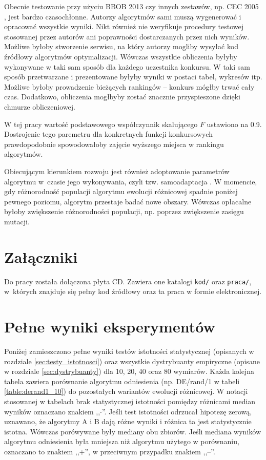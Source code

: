 \documentclass[a4paper,onecolumn,oneside,12pt,wide,floatssmall]{mwrep}
\theoremstyle{definition}
\theoremstyle{plain}%
\theoremstyle{remark}
\begin{document}
Obecnie testowanie przy użyciu BBOB 2013 czy innych zestawów, np. CEC 2005 \cite{cec},
jest bardzo czasochłonne. Autorzy algorytmów sami muszą wygenerować i opracować wszystkie 
wyniki.
Nikt również nie weryfikuje procedury testowej stosowanej przez autorów ani poprawności
dostarczanych przez nich wyników. Możliwe byłoby stworzenie serwisu, na który autorzy mogliby
wysyłać kod źródłowy algorytmów optymalizacji. Wówczas wszystkie obliczenia byłyby wykonywane w taki
sam sposób dla każdego uczestnika konkursu. W taki sam sposób przetwarzane i prezentowane byłyby 
wyniki w postaci tabel, wykresów itp. Możliwe byłoby prowadzenie bieżących rankingów -- konkurs
mógłby trwać cały czas. Dodatkowo, obliczenia mogłbyby zostać znacznie przyspieszone
dzięki chmurze obliczeniowej.

W tej pracy wartość podstawowego współczynnik skalującego $F$ ustawiono na 0.9.
Dostrojenie tego paremetru dla konkretnych funkcji konkursowych prawdopodobnie 
spowodowałoby zajęcie wyższego miejsca w rankingu algorytmów.

Obiecującym kierunkiem rozwoju jest również adoptowanie parametrów algorytmu w~czasie
jego wykonywania, czyli tzw. samoadaptacja \cite{brest}. W momencie, gdy różnorodność populacji
algorytmu ewolucji różnicowej spadnie poniżej pewnego poziomu, algorytm przestaje badać nowe obszary.
Wówczas opłacalne byłoby zwiększenie różnorodności populacji, np. poprzez zwiększenie zasięgu mutacji.

\appendix

\chapter{Załączniki}

Do pracy została dołączona płyta CD. Zawiera one katalogi \texttt{kod/} oraz \texttt{praca/},
w~których znajduje się pełny kod źródłowy oraz ta praca w formie elektronicznej.

\chapter{Pełne wyniki eksperymentów}

Poniżej zamieszczono pełne wyniki testów istotności statystycznej (opisanych w rozdziale 
\ref{sec:testy_istotnosci}) oraz wszystkie
dystrybuanty empiryczne (opisane w rozdziale \ref{sec:dystrybuanty})
dla 10, 20, 40 oraz 80 wymiarów.
Każda kolejna tabela zawiera porównanie algorytmu odniesienia 
(np. DE/rand/1 w tabeli \ref{table:derand1_10}) do pozostałych wariantów ewolucji różnicowej.
W notacji stosowanej w tabelach brak statystycznej istotności pomiędzy różnicami median wyników
oznaczano znakiem ,,$\cdotp$''.
Jeśli test istotności
odrzucał hipotezę zerową, uznawano, że algorytmy A i B dają różne wyniki i różnica ta jest
statystycznie istotna.
Wówczas porówywane były mediany obu zbiorów. 
Jeśli mediana wyników algorytmu odniesienia była mniejsza niż algorytmu użytego w porównaniu,
oznaczano to znakiem ,,+'', w przeciwnym przypadku znakiem ,,--''.
\end{document}
